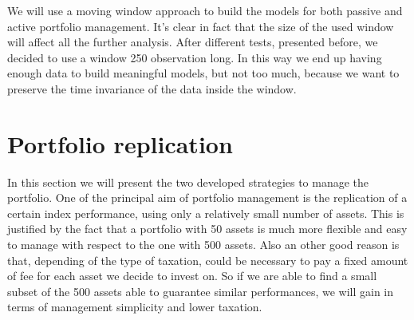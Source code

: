 \documentclass{article}%
\begin{document}
We will use a moving window approach to build the models for both passive and active portfolio management. It's clear in fact that the size of the used window will affect all the further analysis. After different tests, presented before, we decided to use a window 250 observation long. In this way we end up having enough data to build meaningful models, but not too much, because we want to preserve the time invariance of the data inside the window.





\newpage
\section{Portfolio replication}
In this section we will present the two developed strategies to manage the portfolio. 
One of  the principal aim of portfolio management is the replication of a certain index performance, using only a relatively small number of assets. This is justified by the fact that a portfolio with 50 assets is much more flexible and easy to manage with respect to the one with 500 assets. Also an other good reason is that, depending of the type of taxation, could be necessary to pay a fixed amount of fee for each asset we decide to invest on. So if we are able to find a small subset of the 500 assets able to guarantee similar performances, we will gain in terms of management simplicity and lower taxation.
\end{document}

